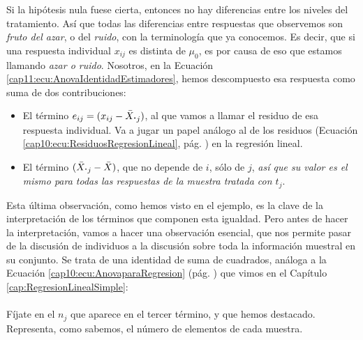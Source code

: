 Si la hipótesis nula fuese cierta, entonces no hay diferencias entre los niveles del tratamiento. Así que todas las diferencias entre respuestas que observemos son {\em fruto del azar}, o del {\em ruido}, con la terminología que ya conocemos. Es decir, que si una respuesta individual $x_{ij}$ es distinta de $\mu_0$, es por causa de eso que estamos llamando {\em azar o ruido}. Nosotros, en la Ecuación \ref{cap11:ecu:AnovaIdentidadEstimadores}, hemos descompuesto esa respuesta como suma de dos contribuciones:
\begin{itemize}
  \item El término $e_{ij}=(x_{ij}-\bar X_{\mbox{\bf\large $\cdot$}j})$, al que vamos a llamar el {\sf residuo} de esa respuesta individual. Va a jugar un papel análogo al de los residuos (Ecuación \ref{cap10:ecu:ResiduosRegresionLineal}, pág. \pageref{cap10:ecu:ResiduosRegresionLineal}) en la regresión lineal.
  \item El término $(\bar X_{\mbox{\bf\large$\cdot$}j}-\bar X)$, que no depende de $i$, sólo de $j$, {\em así que su valor es el mismo para todas las respuestas de la muestra tratada con $t_j$}.
\end{itemize}
Esta última observación, como hemos visto en el ejemplo, es la clave de la interpretación de los términos que componen esta igualdad.  Pero antes de hacer la interpretación, vamos a hacer una observación esencial, que nos permite pasar de la discusión de individuos a la discusión sobre toda la información muestral en su conjunto. Se trata de una identidad de suma de cuadrados, análoga a la  Ecuación \ref{cap10:ecu:AnovaparaRegresion} (pág. \pageref{cap10:ecu:AnovaparaRegresion}) que vimos en el Capítulo \ref{cap:RegresionLinealSimple}:\\[1mm]

    \\[3mm]
Fíjate en el $n_j$ que aparece en el tercer término, y que hemos destacado. Representa, como sabemos, el número de elementos de cada muestra.


